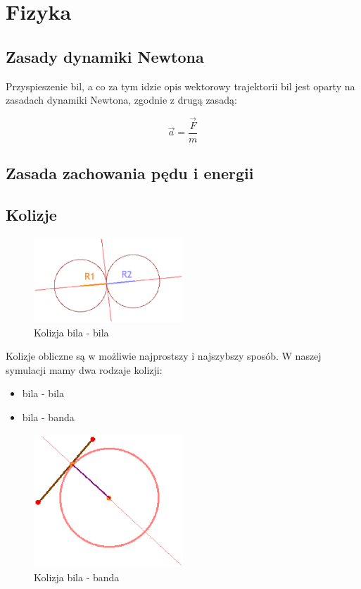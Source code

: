 \section{Fizyka}
\subsection{Zasady dynamiki Newtona}

Przyspieszenie bil, a co za tym idzie opis wektorowy trajektorii bil jest oparty na zasadach 
dynamiki Newtona, zgodnie z drugą zasadą:

\begin{equation}
\vec a = \frac{\vec F}{m}
\end{equation}



\subsection{Zasada zachowania pędu i energii}
\subsection{Kolizje}

\begin{figure}[h]
  \centering
  \includegraphics[width=0.5\textwidth]{./img/bb_col.eps}
  \caption{Kolizja bila - bila}
  \label{fig:bbcol}
\end{figure}

Kolizje obliczne są w możliwie najprostszy i najszybszy sposób. W naszej symulacji mamy dwa rodzaje kolizji:
\begin{itemize}
 \item bila - bila
 \item bila - banda
\end{itemize}

\begin{figure}[h]
  \centering
  \includegraphics[width=0.5\textwidth]{./img/bbd_col.eps}
  \caption{Kolizja bila - banda}
  \label{fig:bbdcol}
\end{figure}

